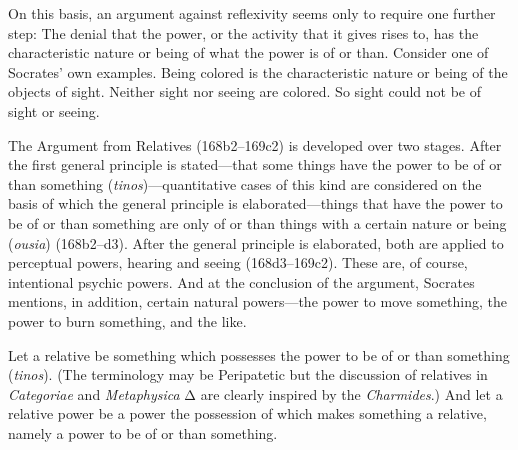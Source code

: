 On this basis, an argument against reflexivity seems only to require one further step: The denial that the power, or the activity that it gives rises to, has the characteristic nature or being of what the power is of or than. Consider one of Socrates' own examples. Being colored is the characteristic nature or being of the objects of sight. Neither sight nor seeing are colored. So sight could not be of sight or seeing.

The Argument from Relatives (168b2–169c2) is developed over two stages. After the first general principle is stated—that some things have the power to be of or than something (\emph{tinos})—quantitative cases of this kind are considered on the basis of which the general principle is elaborated—things that have the power to be of or than something are only of or than things with a certain nature or being (\emph{ousia}) (168b2–d3). After the general principle is elaborated, both are applied to perceptual powers, hearing and seeing (168d3–169c2). These are, of course, intentional psychic powers. And at the conclusion of the argument, Socrates mentions, in addition, certain natural powers—the power to move something, the power to burn something, and the like.

Let a relative be something which possesses the power to be of or than something (\emph{tinos}). (The terminology may be Peripatetic but the discussion of relatives in \emph{Categoriae} and \emph{Metaphysica} {\sbl Δ} are clearly inspired by the \emph{Charmides}.) And let a relative power be a power the possession of which makes something a relative, namely a power to be of or than something. 

